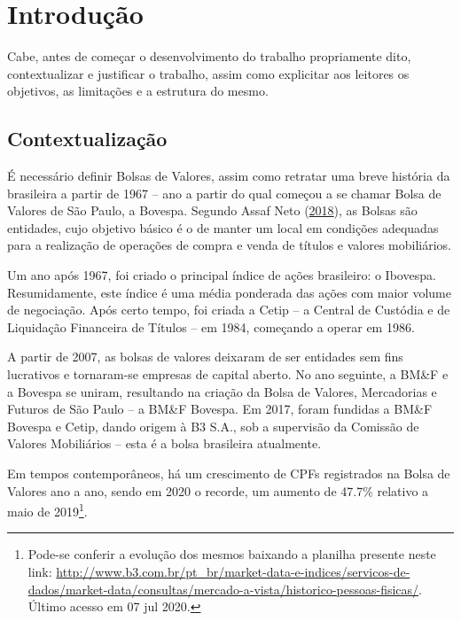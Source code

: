 \documentclass[grad,numbers]{coppe}
\begin{document}
  \listoffigures

  \listoftables

  \printlosymbols
  \printloabbreviations

  \mainmatter

  \hypertarget{introduuxe7uxe3o}{%
  \chapter{Introdução}\label{introduuxe7uxe3o}}

  Cabe, antes de começar o desenvolvimento do trabalho propriamente dito, contextualizar e justificar o trabalho, assim como explicitar aos leitores os objetivos, as limitações e a estrutura do mesmo.

  \hypertarget{contextualizauxe7uxe3o}{%
  \section{Contextualização}\label{contextualizauxe7uxe3o}}

  É necessário definir Bolsas de Valores, assim como retratar uma breve história da brasileira a partir de 1967 -- ano a partir do qual começou a se chamar Bolsa de Valores de São Paulo, a Bovespa. Segundo Assaf Neto (\protect\hyperlink{ref-assafneto2018}{2018}), as Bolsas são entidades, cujo objetivo básico é o de manter um local em condições adequadas para a realização de operações de compra e venda de títulos e valores mobiliários.

  Um ano após 1967, foi criado o principal índice de ações brasileiro: o Ibovespa. Resumidamente, este índice é uma média ponderada das ações com maior volume de negociação. Após certo tempo, foi criada a Cetip -- a Central de Custódia e de Liquidação Financeira de Títulos -- em 1984, começando a operar em 1986.

  A partir de 2007, as bolsas de valores deixaram de ser entidades sem fins lucrativos e tornaram-se empresas de capital aberto. No ano seguinte, a BM\&F e a Bovespa se uniram, resultando na criação da Bolsa de Valores, Mercadorias e Futuros de São Paulo -- a BM\&F Bovespa. Em 2017, foram fundidas a BM\&F Bovespa e Cetip, dando origem à B3 S.A., sob a supervisão da Comissão de Valores Mobiliários -- esta é a bolsa brasileira atualmente.

  Em tempos contemporâneos, há um crescimento de CPFs registrados na Bolsa de Valores ano a ano, sendo em 2020 o recorde, um aumento de 47.7\% relativo a maio de 2019\footnote{Pode-se conferir a evolução dos mesmos baixando a planilha presente neste link: \url{http://www.b3.com.br/pt_br/market-data-e-indices/servicos-de-dados/market-data/consultas/mercado-a-vista/historico-pessoas-fisicas/}. Último acesso em 07 jul 2020.}.
\end{document}

